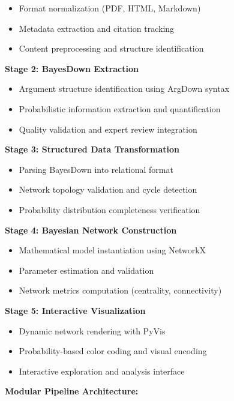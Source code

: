 \documentclass[
  11pt,
  letterpaper,
]{book}
\providecommand{\tightlist}{%
  \setlength{\itemsep}{0pt}\setlength{\parskip}{0pt}}
\begin{document}
\begin{itemize}
\tightlist
\item
  Format normalization (PDF, HTML, Markdown)
\item
  Metadata extraction and citation tracking
\item
  Content preprocessing and structure identification
\end{itemize}

\textbf{Stage 2: BayesDown Extraction}

\begin{itemize}
\tightlist
\item
  Argument structure identification using ArgDown syntax
\item
  Probabilistic information extraction and quantification
\item
  Quality validation and expert review integration
\end{itemize}

\textbf{Stage 3: Structured Data Transformation}

\begin{itemize}
\tightlist
\item
  Parsing BayesDown into relational format
\item
  Network topology validation and cycle detection
\item
  Probability distribution completeness verification
\end{itemize}

\textbf{Stage 4: Bayesian Network Construction}

\begin{itemize}
\tightlist
\item
  Mathematical model instantiation using NetworkX
\item
  Parameter estimation and validation
\item
  Network metrics computation (centrality, connectivity)
\end{itemize}

\textbf{Stage 5: Interactive Visualization}

\begin{itemize}
\tightlist
\item
  Dynamic network rendering with PyVis
\item
  Probability-based color coding and visual encoding
\item
  Interactive exploration and analysis interface
\end{itemize}

\textbf{Modular Pipeline Architecture:}
\end{document}

